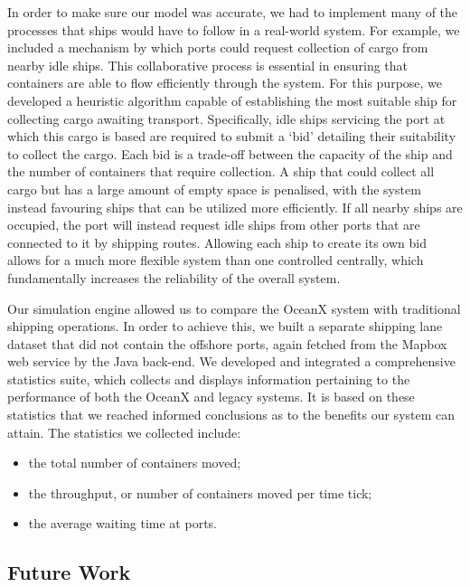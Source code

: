 \newpage
In order to make sure our model was accurate, we had to implement many of the processes that ships would have to follow in a real-world system. For example, we included a mechanism by which ports could request collection of cargo from nearby idle ships. This collaborative process is essential in ensuring that containers are able to flow efficiently through the system. For this purpose, we developed a heuristic algorithm capable of establishing the most suitable ship for collecting cargo awaiting transport. Specifically, idle ships servicing the port at which this cargo is based are required to submit a `bid’ detailing their suitability to collect the cargo. Each bid is a trade-off between the capacity of the ship and the number of containers that require collection. A ship that could collect all cargo but has a large amount of empty space is penalised, with the system instead favouring ships that can be utilized more efficiently. If all nearby ships are occupied, the port will instead request idle ships from other ports that are connected to it by shipping routes. Allowing each ship to create its own bid allows for a much more flexible system than one controlled centrally, which fundamentally increases the reliability of the overall system.

Our simulation engine allowed us to compare the OceanX system with traditional shipping operations. In order to achieve this, we built a separate shipping lane dataset that did not contain the offshore ports, again fetched from the Mapbox web service by the Java back-end. We developed and integrated a comprehensive statistics suite, which collects and displays information pertaining to the performance of both the OceanX and legacy systems. It is based on these statistics that we reached informed conclusions as to the benefits our system can attain. The statistics we collected include:

\begin{itemize}[noitemsep, topsep=1pt]
	\item the total number of containers moved;
	\item the throughput, or number of containers moved per time tick;
	\item the average waiting time at ports.
\end{itemize}

\subsection{Future Work}

